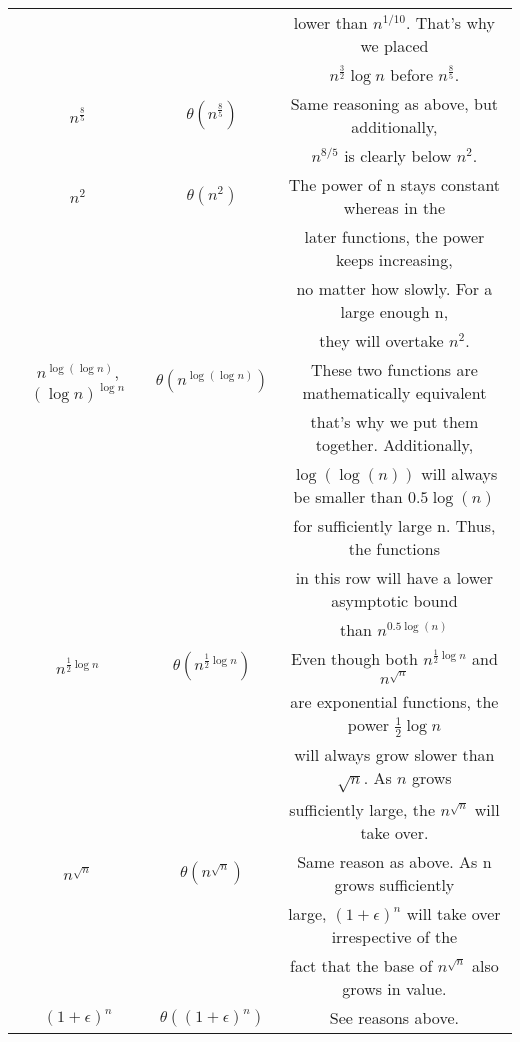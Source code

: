 \documentclass[a4paper,12pt]{article} %
\begin{document}
\begin{minipage}{\textwidth}
\begin{tabular}{|c|c|c|}
        &&lower than $n^{1/10}$. That's why we placed\\
        &&$n^\frac{3}{2}\log n$ before $n^\frac{8}{5}$.\\
        \hline
        $n^\frac{8}{5}$ & $\theta(n^\frac{8}{5})$  & Same reasoning as above, but additionally,\\
        &&$n^{8/5}$ is clearly below $n^2$.\\
        \hline
        $n^2$ & $\theta(n^2)$  & The power of n stays constant whereas in the\\
        &&later functions, the power keeps increasing,\\
        &&no matter how slowly. For a large enough n,\\
        &&they will overtake $n^2$.\\
        \hline
        $n^{\log(\log n)}$, $(\log n)^{\log n}$ & $\theta(n^{\log(\log n)})$  & These two functions are mathematically equivalent\\
        &&that's why we put them together. Additionally,\\
        &&$\log(\log(n))$ will always be smaller than $0.5 \log(n)$\\
        &&for sufficiently large n. Thus, the functions\\
        &&in this row will have a lower asymptotic bound\\
        &&than $n^{0.5\log(n)}$\\
        \hline
        $n^{\frac{1}{2}\log n}$ & $\theta(n^{\frac{1}{2}\log n})$  & Even though both $n^{\frac{1}{2}\log n}$ and $n^{\sqrt{n}}$\\
        &&are exponential functions, the power $\frac{1}{2}\log n$\\
        &&will always grow slower than $\sqrt{n}$. As $n$ grows\\
        &&sufficiently large, the $n^{\sqrt{n}}$ will take over.\\
        \hline
        $n^{\sqrt{n}}$ & $\theta(n^{\sqrt{n}})$  & Same reason as above. As n grows sufficiently\\
        &&large, $(1+\epsilon)^n$ will take over irrespective of the\\
        &&fact that the base of $n^{\sqrt{n}}$ also grows in value.\\
        \hline
        $(1+\epsilon)^n$ & $\theta((1+\epsilon)^n)$  & See reasons above. \\
        \hline
        \hline
    \end{tabular}
    
    \label{tab:inside_minipage}
\end{minipage}
\end{document}
